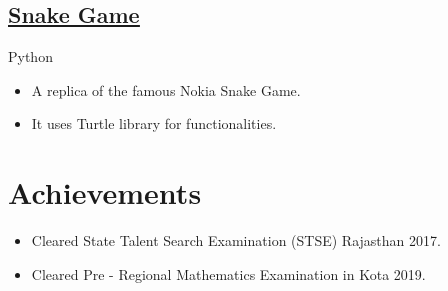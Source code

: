 \documentclass{article}
\begin{document}
\subsection{\href{https://github.com/TusharJ3011/Snake-Game-}{\underline{Snake Game}}}
{\faLaptop} \hspace{0.1in} Python
\vspace{-0.2cm}
\begin{itemize}
  \item A replica of the famous Nokia Snake Game.
    \vspace{-0.3cm}
  \item It uses Turtle library for functionalities.
\end{itemize}

\section{Achievements}
\vspace{-0.35cm}
\begin{itemize}
    \item Cleared State Talent Search Examination (STSE) Rajasthan 2017.
    \vspace{-0.3cm}
    \item Cleared Pre - Regional Mathematics Examination in Kota 2019.
\end{itemize}
\end{document}
